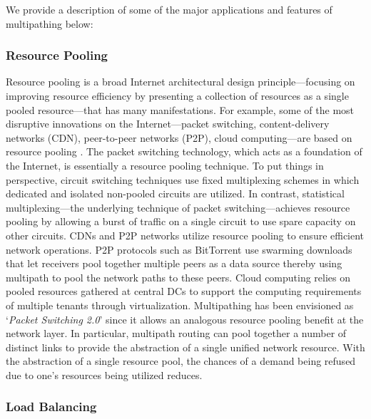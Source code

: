 \documentclass[10pt]{IEEEtran}
\begin{document}
We provide a description of some of the major applications and features of multipathing below:

\vspace{1mm}
\subsubsection{Resource Pooling}  Resource pooling is a broad Internet architectural design principle---focusing on improving resource efficiency by presenting a collection of resources as a single pooled resource---that has many manifestations. For example, some of the most disruptive innovations on the Internet---packet switching, content-delivery networks (CDN), peer-to-peer networks (P2P), cloud computing---are based on resource pooling \cite{wischik2008resource}. The packet switching technology, which acts as a foundation of the Internet, is essentially a resource pooling technique. To put things in perspective, circuit switching techniques use fixed multiplexing schemes in which dedicated and isolated non-pooled circuits are utilized. In contrast, statistical multiplexing---the underlying technique of packet switching---achieves resource pooling by allowing a burst of traffic on a single circuit to use spare capacity on other circuits. CDNs and P2P networks utilize resource pooling to ensure efficient network operations. P2P protocols such as BitTorrent use swarming downloads that let receivers pool together multiple peers as a data source thereby using multipath to pool the network paths to these peers. Cloud computing relies on pooled resources gathered at central DCs to support the computing requirements of multiple tenants through virtualization. Multipathing has been envisioned as `\textit{Packet Switching 2.0}' \cite{wischik2008resource} since it allows an analogous resource pooling benefit at the network layer. In particular, multipath routing can pool together a number of distinct links to provide the abstraction of a single unified network resource. With the abstraction of a single resource pool, the chances of a demand being refused due to one's resources being utilized reduces. 

\vspace{1mm}
\subsubsection{Load Balancing} 
\end{document}
